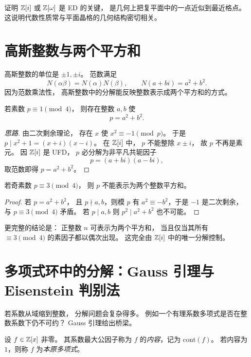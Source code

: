 \begin{remark}
证明 $\mathbb{Z}[i]$ 或 $\mathbb{Z}[\omega]$ 是 ED 的关键，
是几何上把复平面中的一点近似到最近格点。
这说明代数性质常与平面晶格的几何结构密切相关。
\end{remark}

\section{高斯整数与两个平方和}

高斯整数的单位是 $\pm1,\pm i$。
范数满足
\[
N(\alpha\beta)=N(\alpha)N(\beta),
\qquad N(a+bi)=a^2+b^2.
\]
因为范数乘法性，
高斯整数中的分解能反映整数表示成两个平方和的方式。

\begin{proposition}
若素数 $p\equiv1\pmod4$，
则存在整数 $a,b$ 使
\[
p=a^2+b^2.
\]
\end{proposition}

\begin{proof}[思路]
由二次剩余理论，
存在 $x$ 使 $x^2\equiv -1\pmod p$。
于是 $p\mid x^2+1=(x+i)(x-i)$。
在 $\mathbb{Z}[i]$ 中，
$p$ 不能整除 $x\pm i$，
故 $p$ 不再是素元。
因 $\mathbb{Z}[i]$ 是 UFD，
$p$ 必分解为非平凡共轭因子
\[
p=(a+bi)(a-bi),
\]
取范数即得 $p=a^2+b^2$。
\end{proof}

\begin{proposition}
若奇素数 $p\equiv3\pmod4$，
则 $p$ 不能表示为两个整数平方和。
\end{proposition}

\begin{proof}
若 $p=a^2+b^2$，
且 $p\nmid a,b$，则模 $p$ 有
$a^2\equiv -b^2$，于是 $-1$ 是二次剩余，
与 $p\equiv3\pmod4$ 矛盾。
若 $p\mid a,b$ 则 $p^2\mid a^2+b^2$ 也不可能。
\end{proof}

\begin{remark}
更完整的结论是：
正整数 $n$ 可表示为两个平方和，
当且仅当其所有 $\equiv3\pmod4$ 的素因子都以偶次出现。
这完全由 $\mathbb{Z}[i]$ 中的唯一分解控制。
\end{remark}

\section{多项式环中的分解：Gauss 引理与 Eisenstein 判别法}

若系数从域缩到整数，
分解问题会复杂得多。
例如一个有理系数多项式是否在整数系数下仍不可约？
Gauss 引理给出桥梁。

\begin{definition}
设 $f\in \mathbb{Z}[x]$ 非零。
其系数最大公因子称为 $f$ 的\emph{内容}，记为 $\mathrm{cont}(f)$。
若内容为 $1$，则称 $f$ 为\emph{本原多项式}。
\end{definition}


